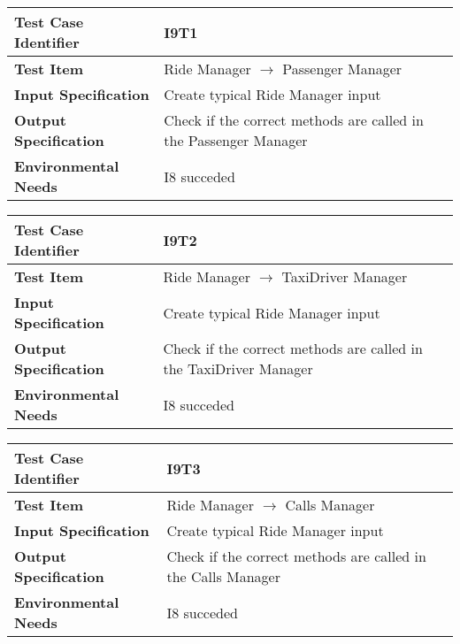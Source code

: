 \begin{table}[!htbp]
\begin{center}
\begin{tabular}[t]{p{}|p{}}

\hline
\textbf{Test Case Identifier} & I9T1 \\
\hline
\textbf{Test Item} & Ride Manager $\rightarrow$ Passenger Manager \\
\hline
\textbf{Input Specification} & Create typical Ride Manager input \\
\hline
\textbf{Output Specification} & Check if the correct methods are called in the Passenger Manager \\
\hline
\textbf{Environmental Needs} & I8 succeded \\
\hline

\end{tabular}
\end{center}
\end{table}

\begin{table}[!htbp]
\begin{center}
\begin{tabular}[t]{p{}|p{}}

\hline
\textbf{Test Case Identifier} & I9T2 \\
\hline
\textbf{Test Item} & Ride Manager $\rightarrow$ TaxiDriver Manager \\
\hline
\textbf{Input Specification} & Create typical Ride Manager input \\
\hline
\textbf{Output Specification} & Check if the correct methods are called in the TaxiDriver Manager \\
\hline
\textbf{Environmental Needs} & I8 succeded \\
\hline

\end{tabular}
\end{center}
\end{table}

\begin{table}[!htbp]
\begin{center}
\begin{tabular}[t]{p{}|p{}}

\hline
\textbf{Test Case Identifier} & I9T3 \\
\hline
\textbf{Test Item} & Ride Manager $\rightarrow$ Calls Manager \\
\hline
\textbf{Input Specification} & Create typical Ride Manager input \\
\hline
\textbf{Output Specification} & Check if the correct methods are called in the Calls Manager \\
\hline
\textbf{Environmental Needs} & I8 succeded \\
\hline

\end{tabular}
\end{center}
\end{table}
\clearpage


